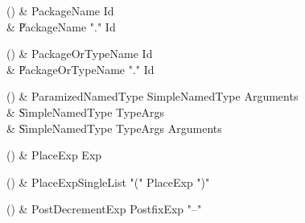 \begin{bbgrammarappendix}

() & PackageName \label{prod:PackageName}  \: Id  \\

 &    \| PackageName \xcd"." Id \\

\end{bbgrammarappendix}

\begin{bbgrammarappendix}

() & PackageOrTypeName \label{prod:PackageOrTypeName}  \: Id  \\

 &    \| PackageOrTypeName \xcd"." Id \\

\end{bbgrammarappendix}

\begin{bbgrammarappendix}

() & ParamizedNamedType \label{prod:ParamizedNamedType}  \: SimpleNamedType Arguments  \\

 &    \| SimpleNamedType TypeArgs \\
 &    \| SimpleNamedType TypeArgs Arguments \\

\end{bbgrammarappendix}

\begin{bbgrammarappendix}

() & PlaceExp \label{prod:PlaceExp}  \: Exp  \\


\end{bbgrammarappendix}

\begin{bbgrammarappendix}

() & PlaceExpSingleList \label{prod:PlaceExpSingleList}  \: \xcd"(" PlaceExp \xcd")"  \\


\end{bbgrammarappendix}

\begin{bbgrammarappendix}

() & PostDecrementExp \label{prod:PostDecrementExp}  \: PostfixExp \xcd"--"  \\


\end{bbgrammarappendix}

